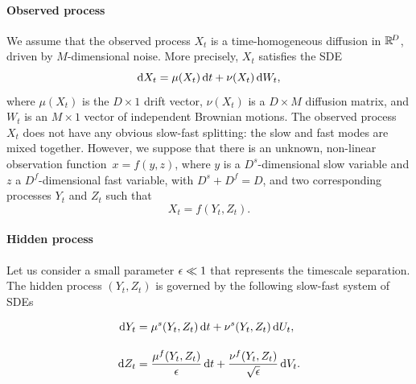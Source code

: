 \documentclass{article}
\begin{document}
\paragraph{Observed process}
We assume that the observed process $X_t$ is a time-homogeneous diffusion in $\mathbb{R}^{\!D}$, driven by $M$-dimensional noise. More precisely, $X_t$ satisfies the SDE
\begin{equation}\label{eq:obs_sde}
    \operatorname{d}\!{X_t} = \mu(X_t)\operatorname{d}\!{t} + \nu(X_t)\operatorname{d}\!{W_t},
\end{equation}
where $\mu(X_t)$ is the $D\times1$ drift vector, $\nu(X_t)$ is a $D\times M$ diffusion matrix, and $W_t$ is an $M\times1$ vector of independent Brownian motions.
The observed process $X_t$ does not have any obvious slow-fast splitting: the slow and fast modes are mixed together.
However, we suppose that there is an unknown, non-linear observation function~$x=f(y,z)$, where $y$ is a $D^s$-dimensional slow variable and $z$ a $D^f$-dimensional fast variable, with $D^s+D^f=D$, and two corresponding processes $Y_t$ and $Z_t$ such that
\begin{equation}
    X_t = f(Y_t, Z_t).
\end{equation}

\paragraph{Hidden process}
Let us consider a small parameter $\epsilon\ll1$ that represents the timescale separation. The hidden process $(Y_t,Z_t)$ is governed by the following slow-fast system of SDEs

\begin{gather}\label{eq:sf_sde}
    \begin{aligned}
        \operatorname{d}\!{Y_t} &= \mu^s(Y_t, Z_t)\operatorname{d}\!{t} + \nu^s(Y_t, Z_t)\operatorname{d}\!{U_t},\\[1em]
        \operatorname{d}\!{Z_t} &= \frac{\mu^f(Y_t, Z_t)}{\epsilon}\operatorname{d}\!{t} + \frac{\nu^f(Y_t, Z_t)}{\sqrt{\epsilon}}\operatorname{d}\!{V_t}.
    \end{aligned}
\end{gather}
\end{document}
